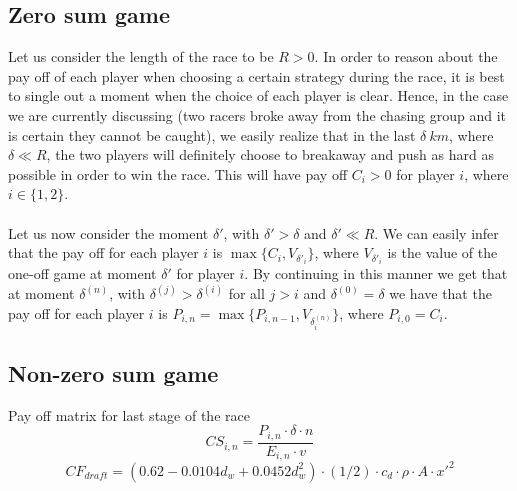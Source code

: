 \documentclass[10pt, a4paper]{report}
\begin{document}
\subsection{Zero sum game}
Let us consider the length of the race to be $R > 0$. In order to reason about the pay off of each player when choosing a certain strategy during the race, it is best to single out a moment when the choice of each player is clear. Hence, in the case we are currently discussing (two racers broke away from the chasing group and it is certain they cannot be caught), we easily realize that in the last $\delta\ km$, where $\delta\ll R$, the two players will definitely choose to breakaway and push as hard as possible in order to win the race. This will have pay off $C_i>0$ for player $i$, where $i \in \{1,2\}$.
\\\\
Let us now consider the moment $\delta'$, with $\delta'>\delta$ and $\delta'\ll R$. We can easily infer that the pay off for each player $i$ is $\max\{C_i,V_{\delta'_i}\}$, where $V_{\delta'_i}$ is the value of the one-off game at moment $\delta'$ for player $i$. By continuing in this manner we get that at moment $\delta^{(n)}$, with $\delta^{(j)}>\delta^{(i)}$ for all $j>i$ and $\delta^{(0)}=\delta$ we have that the pay off for each player $i$ is $P_{i,n} = \max\{P_{i,n-1},V_{\delta^{(n)}_i}\}$, where $P_{i,0} = C_i$.


\subsection{Non-zero sum game}
Pay off matrix for last stage of the race
$$CS_{i,n} = \dfrac{P_{i,n} \cdot \delta \cdot n}{E_{i,n} \cdot v}$$
$$CF_{draft}=(0.62 - 0.0104d_w + 0.0452 d_w^2)\cdot (1/2)\cdot c_d\cdot \rho\cdot A\cdot x'^2$$

\newcommand{\fallbreak}[2]{$(\begin{cases}#1, & \mbox{if } #1 < 1 \\ 0, & \mbox{if } #1 \ge 1\end{cases},\begin{cases}0, & \mbox{if } #2 < 1 \\ #2, & \mbox{if } #2 \ge 1\end{cases})$}
\newcommand{\breakfall}[2]{$(\begin{cases}0, & \mbox{if } #2 < 1 \\ #2, & \mbox{if } #2 \ge 1\end{cases},\begin{cases}#1, & \mbox{if } #1 < 1 \\ 0, & \mbox{if } #1 \ge 1\end{cases})$}
\end{document}

